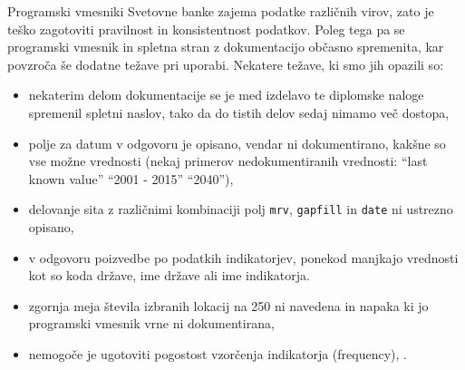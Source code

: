 Programski vmesniki Svetovne banke zajema podatke različnih virov, zato je
teško zagotoviti pravilnost in konsistentnost podatkov. Poleg tega pa se 
programski vmesnik in spletna stran z dokumentacijo občasno spremenita, kar
povzroča še dodatne težave pri uporabi. Nekatere težave, ki smo jih opazili
so:
\begin{itemize}  
\item nekaterim delom dokumentacije se je med izdelavo te diplomske naloge
  spremenil spletni naslov, tako da do tistih delov sedaj nimamo več dostopa,
\item polje za datum v odgovoru je opisano, vendar ni dokumentirano, kakšne so
    vse možne vrednosti (nekaj primerov nedokumentiranih vrednosti:
    ``last known value'' ``2001 - 2015'' ``2040''),
\item delovanje sita z različnimi kombinaciji polj \verb|mrv|, \verb|gapfill|
  in \verb|date| ni ustrezno opisano,
\item v odgovoru poizvedbe po podatkih indikatorjev, ponekod manjkajo vrednosti
  kot so koda države, ime države ali ime indikatorja.
\item zgornja meja števila izbranih lokacij na 250 ni navedena in napaka 
  ki jo programski vmesnik vrne ni dokumentirana,
\item nemogoče je ugotoviti pogostost vzorčenja indikatorja (frequency), .
\end{itemize}  







